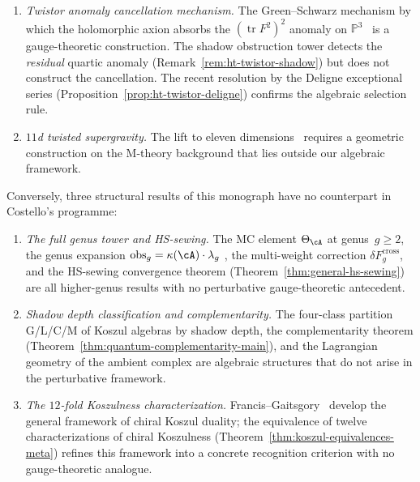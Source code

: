 \begin{remark}
\begin{enumerate}[label=\textup{(\alph*)}]
\item
 \emph{Twistor anomaly cancellation mechanism.}
 The Green--Schwarz mechanism by which the holomorphic axion
 absorbs the $(\operatorname{tr} F^2)^2$ anomaly on
 $\mathbb{P}^3$~\cite{Costello2111} is a gauge-theoretic
 construction. The shadow obstruction tower detects the
 \emph{residual} quartic anomaly
 (Remark~\ref{rem:ht-twistor-shadow}) but does not
 construct the cancellation. The recent resolution by the
 Deligne exceptional series
 (Proposition~\ref{prop:ht-twistor-deligne}) confirms the
 algebraic selection rule.

\item
 \emph{$11$d twisted supergravity.}
 The lift to eleven dimensions~\cite{BittlestonCostello25}
 requires a geometric construction on the M-theory background
 that lies outside our algebraic framework.
\end{enumerate}
Conversely, three structural results of this monograph have
no counterpart in Costello's programme:
\begin{enumerate}[label=\textup{(\alph*)}]
\item
 \emph{The full genus tower and HS-sewing.}
 The MC element $\Theta_\cA$ at genus~$g \geq 2$, the
 genus expansion $\mathrm{obs}_g = \kappa(\cA) \cdot \lambda_g$ ,
 the multi-weight correction
 $\delta F_g^{\mathrm{cross}}$, and the HS-sewing convergence
 theorem (Theorem~\ref{thm:general-hs-sewing}) are all
 higher-genus results with no perturbative gauge-theoretic
 antecedent.

\item
 \emph{Shadow depth classification and complementarity.}
 The four-class partition G/L/C/M of Koszul algebras by shadow
 depth, the complementarity theorem
 (Theorem~\ref{thm:quantum-complementarity-main}), and the
 Lagrangian geometry of the ambient complex are algebraic
 structures that do not arise in the perturbative framework.

\item
 \emph{The $12$-fold Koszulness characterization.}
 Francis--Gaitsgory~\cite{FG12} develop the general
 framework of chiral Koszul duality; the equivalence of twelve
 characterizations of chiral Koszulness
 (Theorem~\ref{thm:koszul-equivalences-meta})
 refines this framework into a concrete recognition criterion
 with no gauge-theoretic analogue.
\end{enumerate}
\end{remark}

